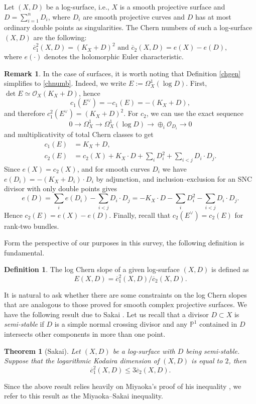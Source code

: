 \documentclass{article}
\theoremstyle{plain}
\newtheorem{theorem}[thm]{Theorem}
\theoremstyle{definition}
\newtheorem{definition}[thm]{Definition}
\newtheorem{remark}[thm]{Remark}
\numberwithin{equation}{section}
\begin{document}
Let $(X,D)$ be a log-surface, i.e., $X$ is a smooth projective surface and $D = \sum_{i=1}^{n} D_{i}$, where $D_{i}$ are smooth projective curves and $D$ has at most ordinary double points as singularities. The Chern numbers of such a log-surface $(X,D)$ are the following:
\begin{equation}
\label{chnumb}
\overline{c}_{1}^{2}(X,D) = (K_{X}+D)^2 \text{ and } \overline{c}_{2}(X,D) = e(X) - e(D),
\end{equation}
where $e(\cdot)$ denotes the holomorphic Euler characteristic.
\begin{remark}
In the case of surfaces, it is worth noting that Definition \ref{chgen} simplifies to \eqref{chnumb}. Indeed, we write $E:=\Omega_X^1(\log D)$. First, $\det E\simeq \mathcal{O}_X(K_X+D)$, hence
$$c_1(E^\vee)=-c_1(E)=-(K_X+D),$$ and therefore $c_1^2(E^\vee)=(K_X+D)^2$. For $c_2$, we can use the exact sequence 
\[0\to \Omega_X^1 \to \Omega_X^1(\log D)\to \oplus_i \mathcal{O}_{D_i}\to 0\]
and multiplicativity of total Chern classes to get
\begin{align*}
c_1(E)&=K_X+D,\\
c_2(E)&=c_2(X)+K_X\cdot D+\sum_i D_i^2+\sum_{i<j}D_i\cdot D_j.
\end{align*}
Since $e(X)=c_2(X)$, and for smooth curves $D_i$ we have $e(D_i)=-(K_X+D_i)\cdot D_i$ by adjunction, and inclusion--exclusion for an SNC divisor with only double points gives \[e(D)=\sum_i e(D_i)-\sum_{i<j}D_i\cdot D_j= -K_X\cdot D-\sum_i D_i^2-\sum_{i<j}D_i\cdot D_j.\]
Hence $c_2(E)=e(X)-e(D)$. Finally, recall that $c_2(E^\vee)=c_2(E)$ for rank‑two bundles.
\end{remark}
Form the perspective of our purposes in this survey, the following definition is fundamental.
\begin{definition}
The log Chern slope of a given log-surface $(X,D)$ is defined as
\[E(X,D) = \overline{c}_{1}^{2}(X,D) / \overline{c}_{2}(X,D).\]
\end{definition}
It is natural to ask whether there are some constraints on the log Chern slopes that are analogous to those proved for smooth complex projective surfaces. We have the following result due to Sakai \cite{Sakai}. Let us recall that a divisor $D \subset X$ is \textit{semi-stable} if $D$ is a simple normal crossing divisor and any $\mathbb{P}^{1}$ contained in $D$ intersects other components in more than one point. 
\begin{theorem}[Sakai]
Let $(X,D)$ be a log-surface with $D$ being semi-stable. Suppose that the logarithmic Kodaira dimension of $(X,D)$ is equal to $2$, then
\[\overline{c}_{1}^{2}(X,D) \leq 3 \overline{c}_{2}(X,D).\]
\end{theorem}
Since the above result relies heavily on Miyaoka's proof of his inequality \cite{M84}, we refer to this result as the Miyaoka--Sakai inequality. 
\end{document}
